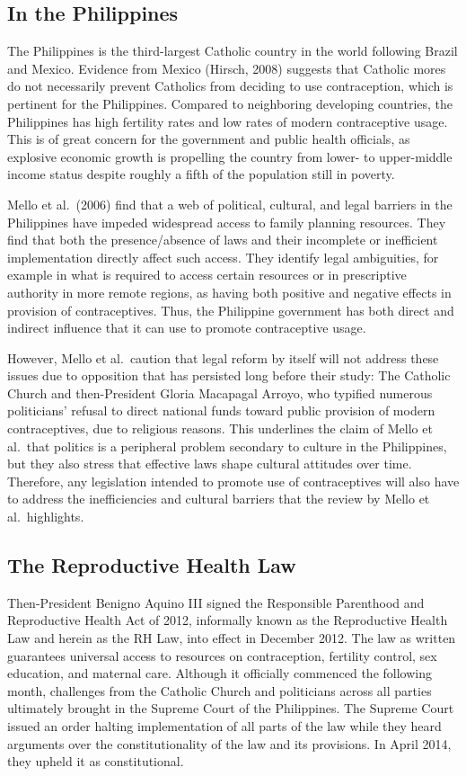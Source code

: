 \documentclass[12pt]{article}
\begin{document}
    \subsection{In the Philippines}
    The Philippines is the third-largest Catholic country in the world following Brazil and Mexico.
    Evidence from Mexico (Hirsch, 2008) suggests that Catholic mores do not necessarily prevent Catholics from deciding to use contraception, which is pertinent for the Philippines.
    Compared to neighboring developing countries, the Philippines has high fertility rates and low rates of modern contraceptive usage.
    This is of great concern for the government and public health officials, as explosive economic growth is propelling the country from lower- to upper-middle income status despite roughly a fifth of the population still in poverty.

    Mello et al.\ (2006) find that a web of political, cultural, and legal barriers in the Philippines have impeded widespread access to family planning resources.
    They find that both the presence/absence of laws and their incomplete or inefficient implementation directly affect such access.
    They identify legal ambiguities, for example in what is required to access certain resources or in prescriptive authority in more remote regions, as having both positive and negative effects in provision of contraceptives.
    Thus, the Philippine government has both direct and indirect influence that it can use to promote contraceptive usage.

    However, Mello et al.\ caution that legal reform by itself will not address these issues due to opposition that has persisted long before their study: The Catholic Church and then-President Gloria Macapagal Arroyo, who typified numerous politicians' refusal to direct national funds toward public provision of modern contraceptives, due to religious reasons.
    This underlines the claim of Mello et al.\ that politics is a peripheral problem secondary to culture in the Philippines, but they also stress that effective laws shape cultural attitudes over time.
    Therefore, any legislation intended to promote use of contraceptives will also have to address the inefficiencies and cultural barriers that the review by Mello et al.\ highlights.


    \subsection{The Reproductive Health Law}
    Then-President Benigno Aquino III signed the Responsible Parenthood and Reproductive Health Act of 2012, informally known as the Reproductive Health Law and herein as the RH Law, into effect in December 2012.
    The law as written guarantees universal access to resources on contraception, fertility control, sex education, and maternal care.
    Although it officially commenced the following month, challenges from the Catholic Church and politicians across all parties ultimately brought in the Supreme Court of the Philippines.
    The Supreme Court issued an order halting implementation of all parts of the law while they heard arguments over the constitutionality of the law and its provisions.
    In April 2014, they upheld it as constitutional.
\end{document}
